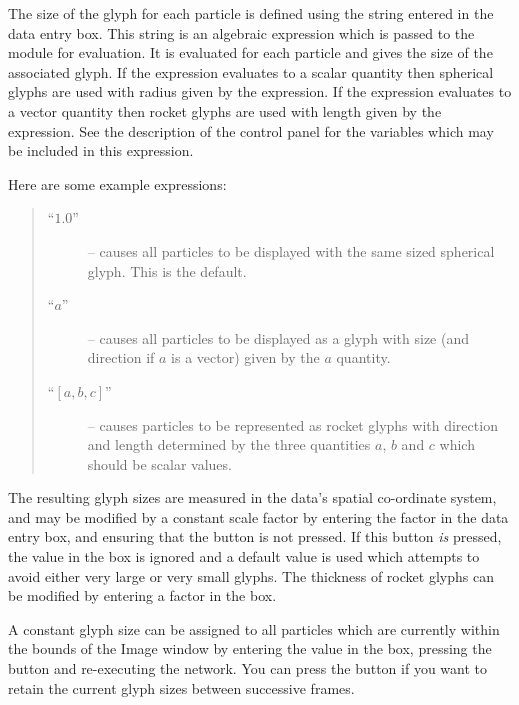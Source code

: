 \begin{description}
The size of the glyph for each particle is defined using the string
entered in the  data entry box. This string
is an algebraic expression which is passed to the  module
for evaluation. It is evaluated for each particle and gives the size of
the associated glyph. If the expression evaluates to a scalar quantity
then spherical glyphs are used with radius given by the expression. If
the expression evaluates to a vector quantity then rocket glyphs are
used with length given by the expression. See the description of the
 control panel for the variables which
may be included in this expression.

Here are some  example expressions:

\begin{quote}
\begin{description}

\item [``$1.0$'' ] -- causes all particles to be displayed with the same sized spherical glyph.
This is the default.

\item [``$a$'' ] -- causes all particles to be displayed as a glyph with size (and direction
if $a$ is a vector) given by the $a$ quantity.

\item [``\mbox{$[a,b,c]$}'' ] -- causes particles to be represented as
rocket glyphs with
direction and length determined by the three quantities $a$, $b$ and $c$
which should be scalar values.

\end{description}
\end{quote}

The resulting glyph sizes are measured in the data's spatial co-ordinate
system, and may be modified by a constant scale factor by entering the
factor in the  data entry box, and ensuring
that the  button is not pressed. If this
button {\em is} pressed, the value in the  box is
ignored and a default value is used which attempts to avoid either very
large or very small glyphs. The thickness of rocket glyphs can be
modified by entering a factor in the  box.

A constant glyph size can be assigned to all particles which are
currently within the bounds of the Image window by entering the value in
the  box, pressing the
 button and re-executing the
network. You can press the  button if you want
to retain the current glyph sizes between successive frames.


\end{description}
